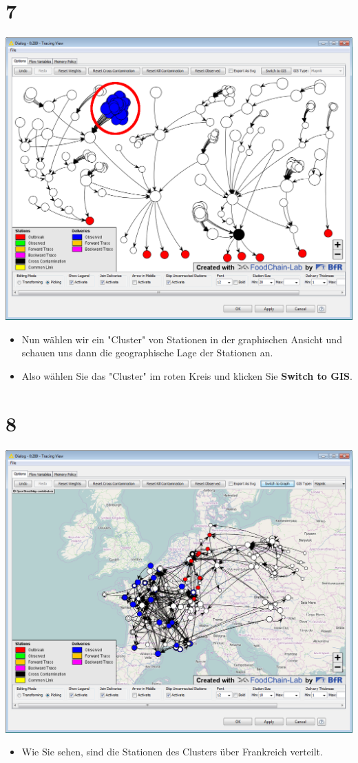 \documentclass{beamer}
\begin{document}
\section{7}
\begin{frame}
	\begin{center}
  		\includegraphics[height=0.6\textheight]{7.png}
	\end{center}
	\begin{itemize}
		\item Nun wählen wir ein "Cluster" von Stationen in der graphischen Ansicht und schauen uns dann die geographische Lage der Stationen an.
		\item Also wählen Sie das "Cluster" im roten Kreis und klicken Sie \textbf{Switch to GIS}.
	\end{itemize}
\end{frame}

\section{8}
\begin{frame}
	\begin{center}
  		\includegraphics[height=0.6\textheight]{8.png}
	\end{center}
	\begin{itemize}
		\item Wie Sie sehen, sind die Stationen des Clusters über Frankreich verteilt.
	\end{itemize}
\end{frame}
\end{document}
